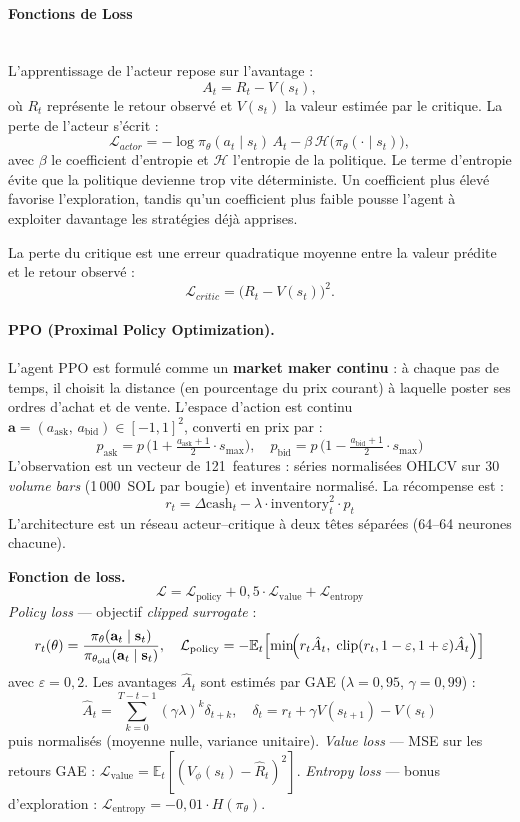 \documentclass[11pt,a4paper]{article}
\begin{document}
\paragraph{Fonctions de Loss}\mbox{} \\

L'apprentissage de l'acteur repose sur l'avantage :
\[
A_t = R_t - V(s_t),
\]
où \(R_t\) représente le retour observé et \(V(s_t)\) la valeur estimée par
le critique. La perte de l'acteur s'écrit :
\[
\mathcal{L}_{actor} =
-\log \pi_\theta(a_t \mid s_t)\, A_t
- \beta \, \mathcal{H}\big(\pi_\theta(\cdot \mid s_t)\big),
\]
avec \(\beta\) le coefficient d'entropie et \(\mathcal{H}\) l'entropie de la
politique. Le terme d'entropie évite que la politique devienne trop vite
déterministe. Un coefficient plus élevé
favorise l'exploration, tandis qu'un coefficient plus faible pousse l'agent
à exploiter davantage les stratégies déjà apprises.

La perte du critique est une erreur quadratique moyenne entre la valeur
prédite et le retour observé :
\[
\mathcal{L}_{critic} = \big(R_t - V(s_t)\big)^2.
\]


\paragraph{PPO (Proximal Policy Optimization).}
L'agent PPO est formulé comme un \textbf{market maker
continu} : à chaque pas de temps, il choisit la
distance (en pourcentage du prix courant) à laquelle
poster ses ordres d'achat et de vente. L'espace
d'action est continu $\mathbf{a} = (a_\text{ask},\,
a_\text{bid}) \in [-1,1]^2$, converti en prix par :
\[
p_\text{ask} = p \,\bigl(1 + \tfrac{a_\text{ask}+1}{2}
\cdot s_{\max}\bigr), \quad
p_\text{bid} = p \,\bigl(1 - \tfrac{a_\text{bid}+1}{2}
\cdot s_{\max}\bigr)
\]
L'observation est un vecteur de 121~features : séries
normalisées OHLCV sur 30 \textit{volume bars} (1\,000~SOL
par bougie) et inventaire normalisé. La récompense est :
\[
r_t = \Delta\text{cash}_t - \lambda \cdot
\text{inventory}_t^2 \cdot p_t
\]
L'architecture est un réseau acteur--critique à deux
têtes séparées (64--64 neurones chacune).

\textbf{Fonction de loss.}
\[
\mathcal{L} = \mathcal{L}_\text{policy}
            + 0{,}5\cdot\mathcal{L}_\text{value}
            + \mathcal{L}_\text{entropy}
\]
\textit{Policy loss} — objectif \textit{clipped surrogate} :
\[
r_t(\theta) = \frac{\pi_\theta(\mathbf{a}_t \mid \mathbf{s}_t)}
                   {\pi_{\theta_\text{old}}(\mathbf{a}_t \mid \mathbf{s}_t)},
\quad
\mathcal{L}_\text{policy} = -\mathbb{E}_t\!\left[
    \min\!\Bigl(
        r_t\hat{A}_t,\;
        \mathrm{clip}(r_t,1-\varepsilon,1+\varepsilon)\hat{A}_t
    \Bigr)
\right]
\]
avec $\varepsilon=0{,}2$. Les avantages $\hat{A}_t$ sont
estimés par GAE ($\lambda=0{,}95$, $\gamma=0{,}99$) :
\[
\hat{A}_t = \sum_{k=0}^{T-t-1}(\gamma\lambda)^k\delta_{t+k},
\quad \delta_t = r_t + \gamma V(s_{t+1}) - V(s_t)
\]
puis normalisés (moyenne nulle, variance unitaire).
\textit{Value loss} — MSE sur les retours GAE :
$\mathcal{L}_\text{value} = \mathbb{E}_t[(V_\phi(s_t)-\hat{R}_t)^2]$.
\textit{Entropy loss} — bonus d'exploration :
$\mathcal{L}_\text{entropy} = -0{,}01\cdot H(\pi_\theta)$.
\end{document}
